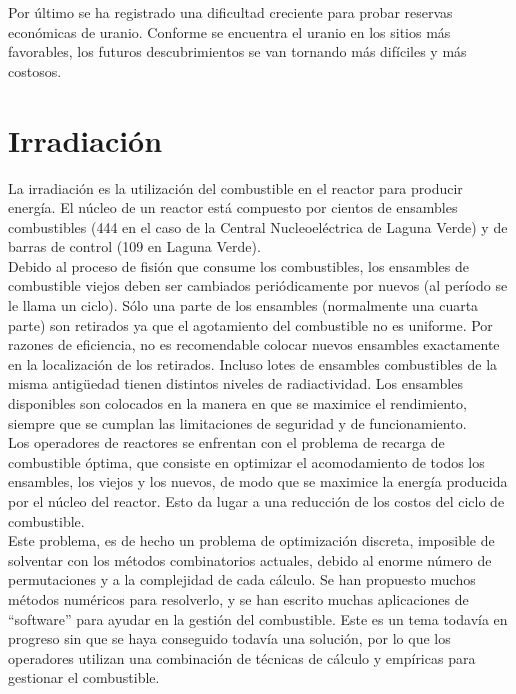 \documentclass[]{article}
\begin{document}
Por último se ha registrado una dificultad creciente para probar reservas económicas de uranio. Conforme se encuentra el uranio en los sitios más favorables, los futuros descubrimientos se van tornando más difíciles y más costosos.\\

\section{Irradiación}

La irradiación es la utilización del combustible en el reactor para producir energía. El núcleo de un reactor está compuesto por cientos de ensambles combustibles (444 en el caso de la Central Nucleoeléctrica de Laguna Verde) y de barras de control (109 en Laguna Verde).\\

Debido al proceso de fisión que consume los combustibles, los ensambles de combustible viejos deben ser cambiados periódicamente por nuevos (al período se le llama un ciclo). Sólo una parte de los ensambles (normalmente una cuarta parte) son retirados ya que el agotamiento del combustible no es uniforme. Por razones de eficiencia, no es recomendable colocar nuevos ensambles exactamente en la localización de los retirados. Incluso lotes de ensambles combustibles de la misma antigüedad tienen distintos niveles de radiactividad. Los ensambles disponibles son colocados en la manera en que se maximice el rendimiento, siempre que se cumplan las limitaciones de seguridad y de funcionamiento.\\

Los operadores de reactores se enfrentan con el problema de recarga de combustible óptima, que consiste en optimizar el acomodamiento de todos los ensambles, los viejos y los nuevos, de modo que se maximice la energía producida por el núcleo del reactor. Esto da lugar a una reducción de los costos del ciclo de combustible.\\

Este problema,  es de hecho un problema de optimización discreta, imposible de solventar con los métodos combinatorios actuales, debido al enorme número de permutaciones y a la complejidad de cada cálculo. Se han propuesto muchos métodos numéricos para resolverlo, y se han escrito muchas aplicaciones de “software” para ayudar en la gestión del combustible. Este es un tema todavía en progreso sin que se haya conseguido todavía una solución, por lo que los operadores utilizan una combinación de técnicas de cálculo y empíricas para gestionar el combustible.\\
\end{document}

